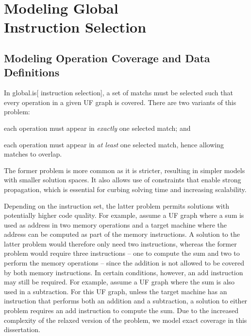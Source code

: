 %

\chapter[Modeling Global Instruction Selection]
        {Modeling Global\\ Instruction Selection}



\section{Modeling Operation Coverage and Data Definitions}

In \gls{global.is}[ \gls{instruction selection}], a set of \glspl{match} must be
selected such that every \gls{operation} in a given \gls{UF graph} is covered.
%
There are two variants of this problem:
%
\begin{enumerate*}[label=(\arabic*)]
  \item each \gls{operation} must appear in \emph{exactly} one selected
    \gls{match}; and
%
  \item each \gls{operation} must appear in \emph{at least} one selected
    \gls{match}, hence allowing matches to \gls{overlap}.
\end{enumerate*}
%
The former problem is more common as it is stricter, resulting in simpler models
with smaller \glspl{solution space}.
%
It also allows use of \glspl{constraint} that enable strong \gls{propagation},
which is essential for curbing solving time and increasing scalability.

Depending on the \gls{instruction set}, the latter problem permits
\glspl{solution} with potentially higher code quality.
%
For example, assume a \gls{UF graph} where a sum is used as address in two
memory operations and a \gls{target machine} where the address can be computed
as part of the memory instructions.
%
A \gls{solution} to the latter problem would therefore only need two
instructions, whereas the former problem would require three instructions -- one
to compute the sum and two to perform the memory operations -- since the
addition is not allowed to be covered by both memory instructions.
%
In certain conditions, however, an add instruction may still be required.
%
For example, assume a \gls{UF graph} where the sum is also used in a
subtraction.
%
For this \gls{UF graph}, unless the \gls{target machine} has an instruction that
performs both an addition and a subtraction, a \gls{solution} to either problem
requires an add instruction to compute the sum.
%
Due to the increased complexity of the relaxed version of the problem, we model
exact coverage in this dissertation.

